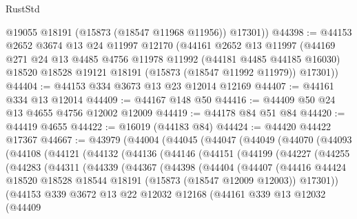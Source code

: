 \begin{lexlean}{RustStd}
\begin{coremodule}
        @19055
        @18191
        (@15873 (@18547 @11968 @11956))
        @17301))
@44398 := @44153
    @2652
    @3674
    @13
    @24
    @11997
    @12170
    (@44161
      @2652
      @13
      @11997
      (@44169
        @271
        @24
        @13
        @4485
        @4756
        @11978
        @11992
        (@44181 @4485 @44185 @16030)
        @18520
        @18528
        @19121
        @18191
        (@15873 (@18547 @11992 @11979))
        @17301))
@44404 := @44153 @334 @3673 @13 @23 @12014 @12169
@44407 := @44161 @334 @13 @12014
@44409 := @44167 @148 @50
@44416 := @44409 @50 @24 @13 @4655 @4756 @12002 @12009
@44419 := @44178 @84 @51 @84
@44420 := @44419 @4655
@44422 := @16019 (@44183 @84)
@44424 := @44420 @44422 @17367
@44667 := @43979
    (@44004
      (@44045
        (@44047
          (@44049
            (@44070
              (@44093
                (@44108
                  (@44121
                    (@44132
                      (@44136
                        (@44146
                          (@44151
                            (@44199
                              (@44227
                                (@44255
                                  (@44283
                                    (@44311
                                      (@44339
                                        (@44367
                                          (@44398
                                            (@44404
                                              (@44407
                                                (@44416
                                                  @44424
                                                  @18520
                                                  @18528
                                                  @18544
                                                  @18191
                                                  (@15873 (@18547 @12009 @12003))
                                                  @17301))
                                              (@44153
                                                @339
                                                @3672
                                                @13
                                                @22
                                                @12032
                                                @12168
                                                (@44161
                                                  @339
                                                  @13
                                                  @12032
                                                  (@44409

\end{coremodule}
\end{lexlean}

